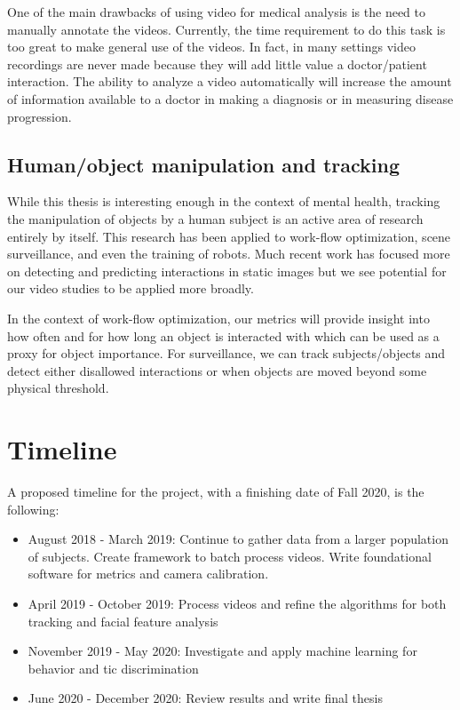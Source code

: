 \documentclass[11pt]{article}
\begin{document}
One of the main drawbacks of using video for medical analysis is the need to manually annotate the videos. Currently, the time requirement to do this task is too great to make general use of the videos. In fact, in many settings video recordings are never made because they will add little value a doctor/patient interaction. The ability to analyze a video automatically will increase the amount of information available to a doctor in making a diagnosis or in measuring disease progression.
\subsection{Human/object manipulation and tracking}
While this thesis is interesting enough in the context of mental health, tracking the manipulation of objects by a human subject is an active area of research entirely by itself. This research has been applied to work-flow optimization, scene surveillance, and even the training of robots. Much recent work has focused more on detecting and predicting interactions in static images but we see potential for our video studies to be applied more broadly.

In the context of work-flow optimization, our metrics will provide insight into how often and for how long an object is interacted with which can be used as a proxy for object importance. For surveillance, we can track subjects/objects and detect either disallowed interactions or when objects are moved beyond some physical threshold.
\section{Timeline}
A proposed timeline for the project, with a finishing date of Fall 2020, is the following:
\begin{itemize}
  \item August 2018 - March 2019: Continue to gather data from a larger population of subjects. Create framework to batch process videos. Write foundational software for metrics and camera calibration.
  \item April 2019 - October 2019: Process videos and refine the algorithms for both tracking and facial feature analysis
  \item November 2019 - May 2020: Investigate and apply machine learning for behavior and tic discrimination
  \item June 2020 - December  2020: Review results and write final thesis
\end{itemize}

\pagebreak
%

\end{document}

